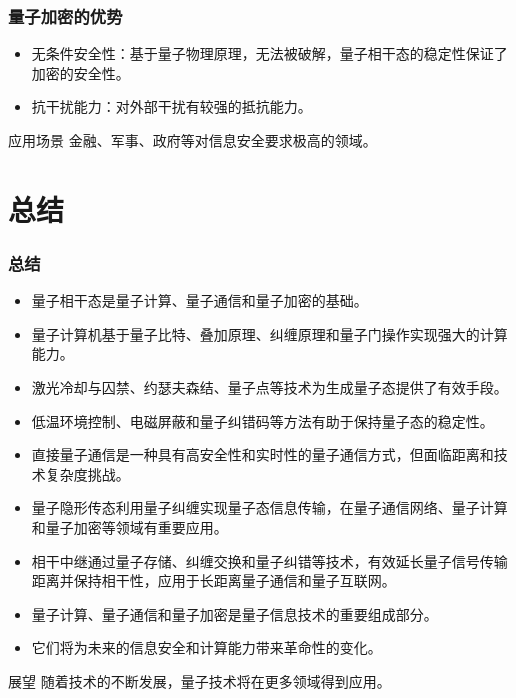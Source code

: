 \begin{frame}
    \frametitle{量子加密的优势}
    \begin{itemize}
        \item 无条件安全性：基于量子物理原理，无法被破解，量子相干态的稳定性保证了加密的安全性。
        \item 抗干扰能力：对外部干扰有较强的抵抗能力。
    \end{itemize}
    \begin{exampleblock}{应用场景}
        金融、军事、政府等对信息安全要求极高的领域。
    \end{exampleblock}
\end{frame}

\section{总结}
\begin{frame}
    \frametitle{总结}
    \begin{itemize}
        \item 量子相干态是量子计算、量子通信和量子加密的基础。
        \item 量子计算机基于量子比特、叠加原理、纠缠原理和量子门操作实现强大的计算能力。
        \item 激光冷却与囚禁、约瑟夫森结、量子点等技术为生成量子态提供了有效手段。
        \item 低温环境控制、电磁屏蔽和量子纠错码等方法有助于保持量子态的稳定性。
        \item 直接量子通信是一种具有高安全性和实时性的量子通信方式，但面临距离和技术复杂度挑战。
        \item 量子隐形传态利用量子纠缠实现量子态信息传输，在量子通信网络、量子计算和量子加密等领域有重要应用。
        \item 相干中继通过量子存储、纠缠交换和量子纠错等技术，有效延长量子信号传输距离并保持相干性，应用于长距离量子通信和量子互联网。
        \item 量子计算、量子通信和量子加密是量子信息技术的重要组成部分。
        \item 它们将为未来的信息安全和计算能力带来革命性的变化。
    \end{itemize}
    \begin{block}{展望}
        随着技术的不断发展，量子技术将在更多领域得到应用。
    \end{block}
\end{frame}
